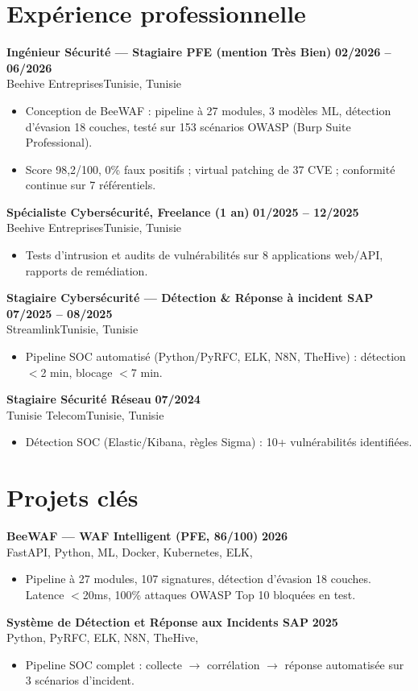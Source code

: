 \documentclass[a4paper,9pt]{article}
\newcommand{\cventry}[4]{\textbf{#1} \hfill \textbf{#4}\\[0.2pt]#2{\ifx\relax#3\relax\else, #3\fi}\par\vspace{0.3pt}}
\begin{document}
\section{Expérience professionnelle}
\cventry{Ingénieur Sécurité --- Stagiaire PFE (mention Très Bien)}{Beehive Entreprises}{Tunisie}{02/2026 -- 06/2026}
\begin{itemize}
  \item Conception de BeeWAF : pipeline à 27 modules, 3 modèles ML, détection d'évasion 18 couches, testé sur 153 scénarios OWASP (Burp Suite Professional).
  \item Score 98,2/100, 0\% faux positifs ; virtual patching de 37 CVE ; conformité continue sur 7 référentiels.
\end{itemize}
\cventry{Spécialiste Cybersécurité, Freelance (1 an)}{Beehive Entreprises}{Tunisie}{01/2025 -- 12/2025}
\begin{itemize}
  \item Tests d'intrusion et audits de vulnérabilités sur 8 applications web/API, rapports de remédiation.
\end{itemize}
\cventry{Stagiaire Cybersécurité --- Détection \& Réponse à incident SAP}{Streamlink}{Tunisie}{07/2025 -- 08/2025}
\begin{itemize}
  \item Pipeline SOC automatisé (Python/PyRFC, ELK, N8N, TheHive) : détection $<$2 min, blocage $<$7 min.
\end{itemize}
\cventry{Stagiaire Sécurité Réseau}{Tunisie Telecom}{Tunisie}{07/2024}
\begin{itemize}
  \item Détection SOC (Elastic/Kibana, règles Sigma) : 10+ vulnérabilités identifiées.
\end{itemize}
\section{Projets clés}
\cventry{BeeWAF --- WAF Intelligent (PFE, 86/100)}{FastAPI, Python, ML, Docker, Kubernetes, ELK}{}{2026}
\begin{itemize}
  \item Pipeline à 27 modules, 107 signatures, détection d'évasion 18 couches. Latence $<$20ms, 100\% attaques OWASP Top 10 bloquées en test.
\end{itemize}
\cventry{Système de Détection et Réponse aux Incidents SAP}{Python, PyRFC, ELK, N8N, TheHive}{}{2025}
\begin{itemize}
  \item Pipeline SOC complet : collecte $\to$ corrélation $\to$ réponse automatisée sur 3 scénarios d'incident.
\end{itemize}
\end{document}
